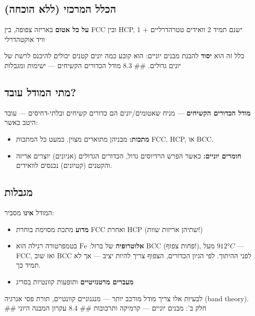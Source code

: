 \documentclass[
  hebrew,
  letterpaper,
  DIV=11,
  numbers=noendperiod]{scrreprt}
\providecommand{\tightlist}{%
  \setlength{\itemsep}{0pt}\setlength{\parskip}{0pt}}
\begin{document}
\subsection{הכלל המרכזי (ללא
הוכחה)}\label{ux5d4ux5dbux5dcux5dc-ux5d4ux5deux5e8ux5dbux5d6ux5d9-ux5dcux5dcux5d0-ux5d4ux5d5ux5dbux5d7ux5d4}

\textbf{על כל אטום} באריזה צפופה, בין FCC ובין HCP, ישנם תמיד 2 וואידים
טטרהדרליים + 1 וויד אוקטהדרלי

כלל זה הוא \textbf{יסוד} להבנת מבנים יוניים: הוא קובע כמה יונים קטנים
יכולים להיכנס לרשת של יונים גדולים. \#\# 8.3 מודל הכדורים הקשיחים ---
ישימות ומגבלות

\subsection{מתי המודל
עובד?}\label{ux5deux5eaux5d9-ux5d4ux5deux5d5ux5d3ux5dc-ux5e2ux5d5ux5d1ux5d3}

\textbf{מודל הכדורים הקשיחים} --- מניח שאטומים/יונים הם כדורים קשיחים
ובלתי-דחיסים --- עובד היטב כאשר:

\begin{itemize}
\tightlist
\item
  \textbf{מתכות:} מבניהן מתוארים מצוין. כמעט כל המתכות FCC, HCP, או BCC.
\item
  \textbf{חומרים יוניים:} כאשר הפרש הרדיוסים גדול, הכדורים הגדולים
  (אניונים) יוצרים אריזה והקטנים (קטיונים) נכנסים לוואידים.
\end{itemize}

\subsection{מגבלות}\label{ux5deux5d2ux5d1ux5dcux5d5ux5ea}

המודל \textbf{אינו} מסביר:

\begin{itemize}
\tightlist
\item
  \textbf{מדוע} מתכת מסוימת בוחרת FCC ואחרת HCP (שתיהן אריזות שוות!)
\item
  \textbf{אלוטרופיה} של ברזל: \(\text{Fe}\) בטמפרטורה רגילה הוא BCC
  (פחות צפוף!), מעל \(912°C\) --- FCC, ואז שוב BCC לפני ההיתוך. לפי
  הגיון הכדורים, הצפוף צריך להיות יציב --- אך לא תמיד כך.
\item
  \textbf{מעברים מרטנזיטיים} ותופעות קוונטיות בסריג
\end{itemize}

לבעיות אלו צריך מודל מורכב יותר --- מנגנוניים קוונטיים, תורת פסי אנרגיה
(band theory). \#\# חלק ב': מבנים יוניים --- קרמיקה ותרכובות \#\# 8.4
עקרון המבנה היוני
\end{document}
